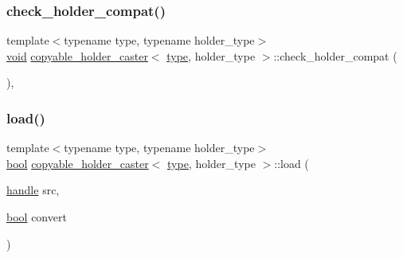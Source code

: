 \subsubsection{\texorpdfstring{check\_holder\_compat()}{check\_holder\_compat()}}
{\footnotesize\ttfamily template$<$typename type, typename holder\+\_\+type$>$ \\
\mbox{\hyperlink{_s_d_l__opengles2__gl2ext_8h_ae5d8fa23ad07c48bb609509eae494c95}{void}} \mbox{\hyperlink{structcopyable__holder__caster}{copyable\+\_\+holder\+\_\+caster}}$<$ \mbox{\hyperlink{_s_d_l__opengl_8h_ad5ddf6fca7b585646515660e810e0188}{type}}, holder\+\_\+type $>$\+::check\+\_\+holder\+\_\+compat (\begin{DoxyParamCaption}{ }\end{DoxyParamCaption})\hspace{0.3cm}{\ttfamily [inline]}, {\ttfamily [protected]}}

\mbox{\label{structcopyable__holder__caster_ad6d2e3b89e1fab57e5a93e15171c0c3a}} 
\subsubsection{\texorpdfstring{load()}{load()}}
{\footnotesize\ttfamily template$<$typename type, typename holder\+\_\+type$>$ \\
\mbox{\hyperlink{asdl_8h_af6a258d8f3ee5206d682d799316314b1}{bool}} \mbox{\hyperlink{structcopyable__holder__caster}{copyable\+\_\+holder\+\_\+caster}}$<$ \mbox{\hyperlink{_s_d_l__opengl_8h_ad5ddf6fca7b585646515660e810e0188}{type}}, holder\+\_\+type $>$\+::load (\begin{DoxyParamCaption}\item[{\mbox{\hyperlink{classhandle}{handle}}}]{src,  }\item[{\mbox{\hyperlink{asdl_8h_af6a258d8f3ee5206d682d799316314b1}{bool}}}]{convert }\end{DoxyParamCaption})\hspace{0.3cm}{\ttfamily [inline]}}

\mbox{\label{structcopyable__holder__caster_a4a9cd62ddae9d35595b889dcf1cde32b}} 
